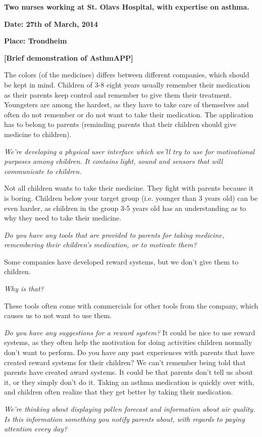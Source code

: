 \textbf{Two nurses working at St. Olavs Hospital, with expertise on asthma.} 

\textbf{Date: 27th of March, 2014}

\textbf{Place: Trondheim}

\textbf{[Brief demonstration of AsthmAPP]}

The colors (of the medicines) differs between different companies, which should be kept in mind. 
Children of 3-8 eight years usually remember their medication as their parents keep control and remember to give them their treatment. 
Youngsters are among the hardest, as they have to take care of themselves and often do not remember or do not want to take their medication. The application has to belong to parents (reminding parents that their children should give medicine to children). 

\emph{We're developing a physical user interface which we'll try to use for motivational purposes among children. It contains light, sound and sensors that will communicate to children.} 

Not all children wants to take their medicine. They fight with parents because it is boring. Children below your target group (i.e. younger than 3 years old) can be even harder, as children in the group 3-5 years old has an understanding as to why they need to take their medicine. 

\emph{Do you have any tools that are provided to parents for taking medicine, remembering their children's medication, or to motivate them?}

Some companies have developed reward systems, but we don't give them to children.

\emph{Why is that?}

These tools often come with commercials for other tools from the company, which causes us to not want to use them. 

\emph{Do you have any suggestions for a reward system?}
It could be nice to use reward systems, as they often help the motivation for doing activities children normally don't want to perform.
Do you have any past experiences with parents that have created reward systems for their children?
 We can't remember being told that parents have created award systems. It could be that parents don't tell us about it, or they simply don't do it. Taking an asthma medication is quickly over with, and children often realize that they get better by taking their medication.

\emph{We're thinking about displaying pollen forecast and information about air quality. Is this information something you notify parents about, with regards to paying attention every day?}

